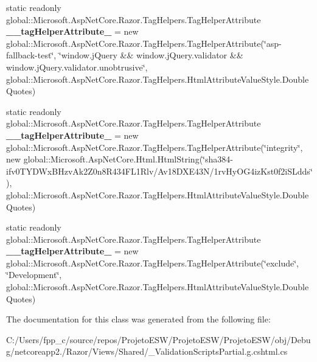 \begin{DoxyCompactItemize}
static readonly global\+::\+Microsoft.\+Asp\+Net\+Core.\+Razor.\+Tag\+Helpers.\+Tag\+Helper\+Attribute {\bfseries \+\_\+\+\_\+tag\+Helper\+Attribute\+\_} = new global\+::\+Microsoft.\+Asp\+Net\+Core.\+Razor.\+Tag\+Helpers.\+Tag\+Helper\+Attribute(\char`\"{}asp-\/fallback-\/test\char`\"{}, \char`\"{}window.\+j\+Query \&\& window.\+j\+Query.\+validator \&\& window.\+j\+Query.\+validator.\+unobtrusive\char`\"{}, global\+::\+Microsoft.\+Asp\+Net\+Core.\+Razor.\+Tag\+Helpers.\+Html\+Attribute\+Value\+Style.\+Double\+Quotes)
\item 
\mbox{\label{class_asp_net_core_1_1_views___shared_____validation_scripts_partial_a69314803b46617ea7cfd97a88cc23e0b}} 
static readonly global\+::\+Microsoft.\+Asp\+Net\+Core.\+Razor.\+Tag\+Helpers.\+Tag\+Helper\+Attribute {\bfseries \+\_\+\+\_\+tag\+Helper\+Attribute\+\_} = new global\+::\+Microsoft.\+Asp\+Net\+Core.\+Razor.\+Tag\+Helpers.\+Tag\+Helper\+Attribute(\char`\"{}integrity\char`\"{}, new global\+::\+Microsoft.\+Asp\+Net\+Core.\+Html.\+Html\+String(\char`\"{}sha384-\/ifv0\+T\+Y\+D\+Wx\+B\+Hzv\+Ak2\+Z0n8\+R434\+F\+L1\+Rlv/Av18\+D\+X\+E43N/1rv\+Hy\+O\+G4iz\+Kst0f2i\+S\+Ldds\char`\"{}), global\+::\+Microsoft.\+Asp\+Net\+Core.\+Razor.\+Tag\+Helpers.\+Html\+Attribute\+Value\+Style.\+Double\+Quotes)
\item 
\mbox{\label{class_asp_net_core_1_1_views___shared_____validation_scripts_partial_aabb1aa45556790dcfdaf05db05173362}} 
static readonly global\+::\+Microsoft.\+Asp\+Net\+Core.\+Razor.\+Tag\+Helpers.\+Tag\+Helper\+Attribute {\bfseries \+\_\+\+\_\+tag\+Helper\+Attribute\+\_} = new global\+::\+Microsoft.\+Asp\+Net\+Core.\+Razor.\+Tag\+Helpers.\+Tag\+Helper\+Attribute(\char`\"{}exclude\char`\"{}, \char`\"{}Development\char`\"{}, global\+::\+Microsoft.\+Asp\+Net\+Core.\+Razor.\+Tag\+Helpers.\+Html\+Attribute\+Value\+Style.\+Double\+Quotes)
\end{DoxyCompactItemize}


The documentation for this class was generated from the following file\+:\begin{DoxyCompactItemize}
\item 
C\+:/\+Users/fpp\+\_\+c/source/repos/\+Projeto\+E\+S\+W/\+Projeto\+E\+S\+W/\+Projeto\+E\+S\+W/obj/\+Debug/netcoreapp2./\+Razor/\+Views/\+Shared/\+\_\+\+Validation\+Scripts\+Partial.\+g.\+cshtml.\+cs\end{DoxyCompactItemize}
